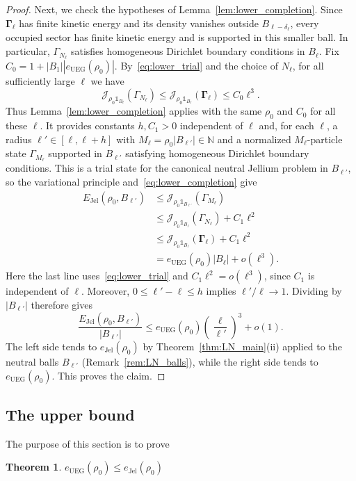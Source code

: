 \documentclass[final,reqno]{amsart}
\newtheorem{theorem}{Theorem}[section]
\theoremstyle{remark}
\theoremstyle{definition}
\renewcommand{\le}{\leqslant}
\newcommand{\NN}{\mathbb{N}}
\newcommand{\iden}{\mathbb{1}}
\newcommand{\UEG}{\mathrm{UEG}}
\newcommand{\Jel}{\mathrm{Jel}}
\newcommand{\vGamma}{{\bm{\Gamma}}}
\begin{document}
\begin{proof}
Next, we check the hypotheses of Lemma~\ref{lem:lower_completion}. Since $\vGamma_\ell$ has finite kinetic energy and its density vanishes outside $B_{\ell-\delta_\ell}$, every occupied sector has finite kinetic energy and is supported in this smaller ball. In particular, $\Gamma_{N_\ell}$ satisfies homogeneous Dirichlet boundary conditions in $B_\ell$. Fix $C_0=1+|B_1||e_\UEG(\rho_0)|$.
By~\eqref{eq:lower_trial} and the choice of $N_\ell$, for all sufficiently large $\ell$ we have
\[
\mathcal J_{\rho_0\iden_{B_\ell}}(\Gamma_{N_\ell})
\le\mathcal J_{\rho_0\iden_{B_\ell}}(\vGamma_\ell)
\le C_0\ell^3.
\]
Thus Lemma~\ref{lem:lower_completion} applies with the same $\rho_0$ and $C_0$ for all these $\ell$. It provides constants $h,C_1>0$ independent of $\ell$ and, for each $\ell$, a radius $\ell'\in[\ell,\ell+h]$ with $M_\ell=\rho_0|B_{\ell'}|\in\NN$ and a normalized $M_\ell$-particle state $\Gamma_{M_\ell}$ supported in $B_{\ell'}$ satisfying homogeneous Dirichlet boundary conditions. This is a trial state for the canonical neutral Jellium problem in $B_{\ell'}$, so the variational principle and~\eqref{eq:lower_completion} give
\begin{align*}
E_\Jel(\rho_0,B_{\ell'})
&\le\mathcal J_{\rho_0\iden_{B_{\ell'}}}(\Gamma_{M_\ell})\\
&\le\mathcal J_{\rho_0\iden_{B_\ell}}(\Gamma_{N_\ell})+C_1\ell^2\\
&\le\mathcal J_{\rho_0\iden_{B_\ell}}(\vGamma_\ell)+C_1\ell^2\\
&=e_\UEG(\rho_0)|B_\ell|+o(\ell^3).
\end{align*}
Here the last line uses~\eqref{eq:lower_trial} and $C_1\ell^2=o(\ell^3)$, since $C_1$ is independent of $\ell$. Moreover, $0\le\ell'-\ell\le h$ implies $\ell'/\ell\to1$. Dividing by $|B_{\ell'}|$ therefore gives
\[
\frac{E_\Jel(\rho_0,B_{\ell'})}{|B_{\ell'}|}
\le e_\UEG(\rho_0)\left(\frac\ell{\ell'}\right)^3+o(1).
\]
The left side tends to $e_\Jel(\rho_0)$ by Theorem~\ref{thm:LN_main}(ii) applied to the neutral balls $B_{\ell'}$ (Remark~\ref{rem:LN_balls}), while the right side tends to $e_\UEG(\rho_0)$. This proves the claim.
\end{proof}

\subsection{The upper bound}\label{sec:upper}

The purpose of this section is to prove

\begin{theorem}\label{thm:upper}
$e_\UEG(\rho_0)\le e_\Jel(\rho_0)$
\end{theorem}
\end{document}
